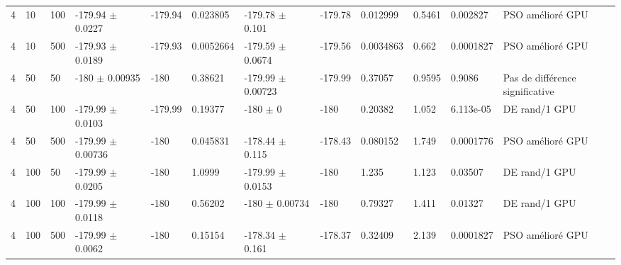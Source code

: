 \begin{table}[t]
\begin{tabular}{llllllllllll}
4 & 10 & 100 & -179.94 $\pm$ 0.0227 & -179.94 & 0.023805 & -179.78 $\pm$ 0.101 & -179.78 & 0.012999 & 0.5461 & 0.002827 & PSO amélioré GPU \\
4 & 10 & 500 & -179.93 $\pm$ 0.0189 & -179.93 & 0.0052664 & -179.59 $\pm$ 0.0674 & -179.56 & 0.0034863 & 0.662 & 0.0001827 & PSO amélioré GPU \\
4 & 50 & 50 & -180 $\pm$ 0.00935 & -180 & 0.38621 & -179.99 $\pm$ 0.00723 & -179.99 & 0.37057 & 0.9595 & 0.9086 & Pas de différence significative \\
4 & 50 & 100 & -179.99 $\pm$ 0.0103 & -179.99 & 0.19377 & -180 $\pm$ 0 & -180 & 0.20382 & 1.052 & 6.113e-05 & DE rand/1 GPU \\
4 & 50 & 500 & -179.99 $\pm$ 0.00736 & -180 & 0.045831 & -178.44 $\pm$ 0.115 & -178.43 & 0.080152 & 1.749 & 0.0001776 & PSO amélioré GPU \\
4 & 100 & 50 & -179.99 $\pm$ 0.0205 & -180 & 1.0999 & -179.99 $\pm$ 0.0153 & -180 & 1.235 & 1.123 & 0.03507 & DE rand/1 GPU \\
4 & 100 & 100 & -179.99 $\pm$ 0.0118 & -180 & 0.56202 & -180 $\pm$ 0.00734 & -180 & 0.79327 & 1.411 & 0.01327 & DE rand/1 GPU \\
4 & 100 & 500 & -179.99 $\pm$ 0.0062 & -180 & 0.15154 & -178.34 $\pm$ 0.161 & -178.37 & 0.32409 & 2.139 & 0.0001827 & PSO amélioré GPU \\
\bottomrule
\end{tabular}
\end{table}
